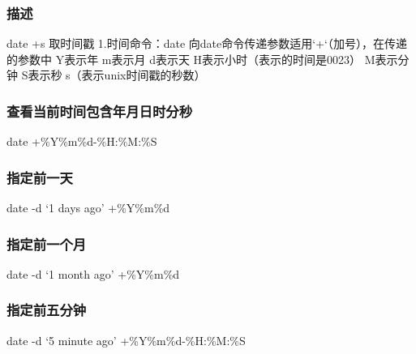 \documentclass[letterpaper,10pt,english]{sphinxmanual}
\begin{document}
\subsubsection{描述}
\label{\detokenize{scripts/shell/date:id1}}
%
\begin{sphinxVerbatim}[commandchars=\\\{\}]
date +\PYGZpc{}s 取时间戳
1.时间命令：date
向date命令传递参数适用‘+‘（加号），在传递的参数中
\PYGZpc{}Y表示年
\PYGZpc{}m表示月
\PYGZpc{}d表示天
\PYGZpc{}H表示小时（表示的时间是00\PYGZhy{}23）
\PYGZpc{}M表示分钟
\PYGZpc{}S表示秒
\PYGZpc{}s（表示unix时间戳的秒数）
\end{sphinxVerbatim}


\subsubsection{查看当前时间包含年月日时分秒}
\label{\detokenize{scripts/shell/date:id2}}
date  +\%Y\%m\%d-\%H:\%M:\%S


\subsubsection{指定前一天}
\label{\detokenize{scripts/shell/date:id3}}
date -d ‘1 days ago’ +\%Y\%m\%d


\subsubsection{指定前一个月}
\label{\detokenize{scripts/shell/date:id4}}
date -d ‘1 month ago’ +\%Y\%m\%d


\subsubsection{指定前五分钟}
\label{\detokenize{scripts/shell/date:id5}}
date -d ‘5 minute ago’ +\%Y\%m\%d-\%H:\%M:\%S
\end{document}
